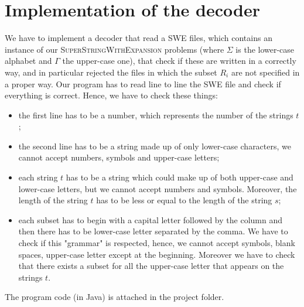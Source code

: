\documentclass[paper=a4, fontsize=11pt]{scrartcl}
\numberwithin{equation}{section}		%
\numberwithin{figure}{section}			%
\numberwithin{table}{section}				%
\begin{document}
\section{Implementation of the decoder}
We have to implement a decoder that read a SWE files, which contains an instance of our \textsc{SuperStringWithExpansion} problems (where $\Sigma$ is the lower-case alphabet and $\Gamma$ the upper-case one), that check if these are written in a correctly way, and in particular rejected the files in which the subset $R_i$ are not specified in a proper way.  \newline
Our program has to read line to line the SWE file and check if everything is correct. Hence, we have to check these things:
\begin{itemize}
	\item the first line has to be a number, which represents the number of the strings $t$;
	\item the second line has to be a string made up of only lower-case characters, we cannot accept numbers, symbols and upper-case letters;
	\item each string $t$ has to be a string which could make up of both upper-case and lower-case letters, but we cannot accept numbers and symbols. Moreover, the length of the string $t$ has to be less or equal to the length of the string $s$;
	\item each subset has to begin with a capital letter followed by the column and then there has to be lower-case letter separated by the comma. We have to check if this "grammar" is respected, hence, we cannot accept symbols, blank spaces, upper-case letter except at the beginning. Moreover we have to check that there exists a subset for all the upper-case letter that appears on the strings $t$.
\end{itemize}
The program code (in Java) is attached in the project folder. 
\end{document}
